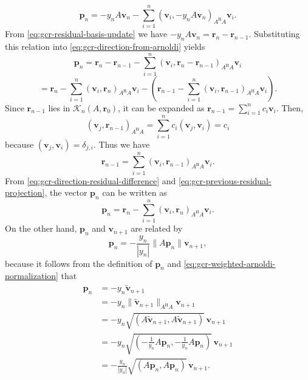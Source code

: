 \begin{equation}\label{eq:gcr-direction-from-arnoldi}\bm p_n=-y_nA\bm v_n-\sum_{i=1}^n(\bm v_i,-y_nA\bm v_n)_{A^{\mathrm H}A}\bm v_i.\end{equation}
{From \eqref{eq:gcr-residual-basis-update} we have $-y_nA\bm v_n=\bm r_n-\bm r_{n-1}$. Substituting this relation into \eqref{eq:gcr-direction-from-arnoldi} yields}
\begin{equation}\label{eq:gcr-direction-residual-difference}\bm p_n=\bm r_n-\bm r_{n-1}-\sum_{i=1}^n(\bm v_i,\bm r_n-\bm r_{n-1})_{A^{\mathrm H}A}\bm v_i\end{equation}
\[=\bm r_n-\sum_{i=1}^n(\bm v_i,\bm r_n)_{A^{\mathrm H}A}\bm v_i-\left(\bm r_{n-1}-\sum_{i=1}^n(\bm v_i,\bm r_{n-1})_{A^{\mathrm H}A}\bm v_i\right).\]
{Since $\bm r_{n-1}$ lies in $\mathcal K_n(A,\bm r_0)$, it can be expanded as $\bm r_{n-1}=\sum_{i=1}^nc_i\bm v_i$. Then,}
\[(\bm v_j,\bm r_{n-1})_{A^{\mathrm H}A}=\sum_{i=1}^nc_i(\bm v_j,\bm v_i)=c_i\]
{because $(\bm v_j,\bm v_i)=\delta_{j,i}$. Thus we have}
\begin{equation}\label{eq:gcr-previous-residual-projection}\bm r_{n-1}=\sum_{i=1}^n(\bm v_i,\bm r_{n-1})_{A^{\mathrm H}A}\bm v_i.\end{equation}
{From \eqref{eq:gcr-direction-residual-difference} and \eqref{eq:gcr-previous-residual-projection}, the vector $\bm p_n$ can be written as}
\begin{equation}\label{eq:gcr-direction-weighted-projection}\bm p_n=\bm r_n-\sum_{i=1}^n(\bm v_i,\bm r_n)_{A^{\mathrm H}A}\bm v_i.\end{equation}
{On the other hand, $\bm p_n$ and $\bm v_{n+1}$ are related by}
\[\bm p_n=-\frac{y_n}{|y_n|}\|A\bm p_n\|\bm v_{n+1},\]
{because it follows from the definition of $\bm p_n$ and \eqref{eq:gcr-weighted-arnoldi-normalization} that}
\[\begin{aligned}\bm p_n&=-y_n\widetilde{\bm v}_{n+1}\\&=-y_n\|\widetilde{\bm v}_{n+1}\|_{A^{\mathrm H}A}\bm v_{n+1}\\&=-y_n\sqrt{(A\widetilde{\bm v}_{n+1},A\widetilde{\bm v}_{n+1})}\,\bm v_{n+1}\\&=-y_n\sqrt{\left(-\frac1{y_n}A\bm p_n,-\frac1{y_n}A\bm p_n\right)}\,\bm v_{n+1}\\&=-\frac{y_n}{|y_n|}\sqrt{(A\bm p_n,A\bm p_n)}\,\bm v_{n+1}.\end{aligned}\]
